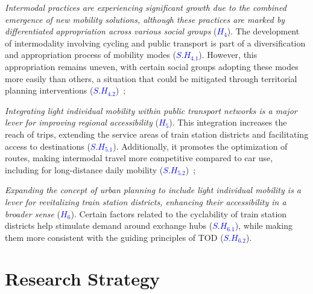 \begin{refsegment}
\begin{customitemize}
    \item \textsl{Intermodal practices are experiencing significant growth due to the combined emergence of new mobility solutions, although these practices are marked by differentiated appropriation across various social groups} ({\textcolor{blue}{\(H_4\)}\label{hypothese-4}}). The development of intermodality involving cycling and public transport is part of a diversification and appropriation process of mobility modes ({\textcolor{blue}{\(S.H_{4.1}\)}\label{sous-hypothese-4.1}}). However, this appropriation remains uneven, with certain social groups adopting these modes more easily than others, a situation that could be mitigated through territorial planning interventions ({\textcolor{blue}{\(S.H_{4.2}\)}\label{sous-hypothese-4.2}})~;
    \item \textsl{Integrating light individual mobility within public transport networks is a major lever for improving regional accessibility} ({\textcolor{blue}{\(H_5\)}\label{hypothese-5}}). This integration increases the reach of trips, extending the service areas of train station districts and facilitating access to destinations ({\textcolor{blue}{\(S.H_{5.1}\)}\label{sous-hypothese-5.1}}). Additionally, it promotes the optimization of routes, making intermodal travel more competitive compared to car use, including for long-distance daily mobility ({\textcolor{blue}{\(S.H_{5.2}\)}\label{sous-hypothese-5.2}})~;
    \item \textsl{Expanding the concept of urban planning to include light individual mobility is a lever for revitalizing train station districts, enhancing their accessibility in a broader sense} ({\textcolor{blue}{\(H_6\)}\label{hypothese-6}}). Certain factors related to the cyclability of train station districts help stimulate demand around exchange hubs ({\textcolor{blue}{\(S.H_{6.1}\)}\label{sous-hypothese-6.1}}), while making them more consistent with the guiding principles of \acrshort{TOD} ({\textcolor{blue}{\(S.H_{6.2}\)}\label{sous-hypothese-6.2}}).
\end{customitemize}%

\section*{Research Strategy
    \label{introduction-generale:methodologie}
    }


\end{refsegment}
